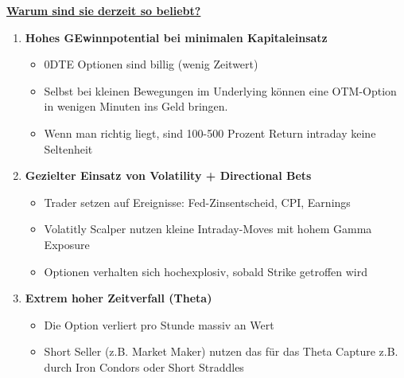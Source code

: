 \textbf{\underline{Warum sind sie derzeit so beliebt?}}
\begin{enumerate}
  \item \textbf{Hohes GEwinnpotential bei minimalen Kapitaleinsatz}
  \begin{itemize}
    \item 0DTE Optionen sind billig (wenig Zeitwert)
    \item Selbst bei kleinen Bewegungen im Underlying können eine OTM-Option in wenigen Minuten ins Geld bringen.
    \item Wenn man richtig liegt, sind 100-500 Prozent Return intraday keine Seltenheit
  \end{itemize}
  \item \textbf{Gezielter Einsatz von Volatility + Directional Bets}
  \begin{itemize}
    \item Trader setzen auf Ereignisse: Fed-Zinsentscheid, CPI, Earnings
    \item Volatitly Scalper nutzen kleine Intraday-Moves mit hohem Gamma Exposure
    \item Optionen verhalten sich hochexplosiv, sobald Strike getroffen wird
  \end{itemize}
  \item \textbf{Extrem hoher Zeitverfall (Theta)}
  \begin{itemize}
    \item Die Option verliert pro Stunde massiv an Wert
    \item Short Seller (z.B. Market Maker) nutzen das für das Theta Capture z.B. durch Iron Condors oder Short Straddles
  \end{itemize}
\end{enumerate}

